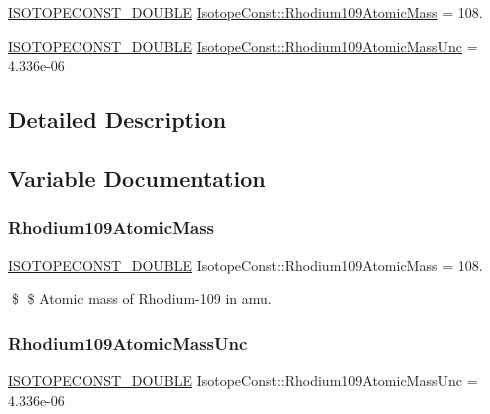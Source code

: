 \begin{DoxyCompactItemize}
\item 
\mbox{\hyperlink{group___isotope_const-_macros_ga8f45a7272ce02c0b4c65c44636ed719a}{I\+S\+O\+T\+O\+P\+E\+C\+O\+N\+S\+T\+\_\+\+D\+O\+U\+B\+LE}} \mbox{\hyperlink{group___isotope_const-_rhodium-_rh109_ga35e45ef6b10371bcb2f4fcdcb2b3c561}{Isotope\+Const\+::\+Rhodium109\+Atomic\+Mass}} = 108.
\item 
\mbox{\hyperlink{group___isotope_const-_macros_ga8f45a7272ce02c0b4c65c44636ed719a}{I\+S\+O\+T\+O\+P\+E\+C\+O\+N\+S\+T\+\_\+\+D\+O\+U\+B\+LE}} \mbox{\hyperlink{group___isotope_const-_rhodium-_rh109_ga21c3affbc5914f3138fb41a68f8fac2c}{Isotope\+Const\+::\+Rhodium109\+Atomic\+Mass\+Unc}} = 4.\+336e-\/06
\end{DoxyCompactItemize}


\subsection{Detailed Description}


\subsection{Variable Documentation}
\mbox{\label{group___isotope_const-_rhodium-_rh109_ga35e45ef6b10371bcb2f4fcdcb2b3c561}} 
\subsubsection{\texorpdfstring{Rhodium109\+Atomic\+Mass}{Rhodium109AtomicMass}}
{\footnotesize\ttfamily \mbox{\hyperlink{group___isotope_const-_macros_ga8f45a7272ce02c0b4c65c44636ed719a}{I\+S\+O\+T\+O\+P\+E\+C\+O\+N\+S\+T\+\_\+\+D\+O\+U\+B\+LE}} Isotope\+Const\+::\+Rhodium109\+Atomic\+Mass = 108.}

\$ \$ Atomic mass of Rhodium-\/109 in amu. \mbox{\label{group___isotope_const-_rhodium-_rh109_ga21c3affbc5914f3138fb41a68f8fac2c}} 
\subsubsection{\texorpdfstring{Rhodium109\+Atomic\+Mass\+Unc}{Rhodium109AtomicMassUnc}}
{\footnotesize\ttfamily \mbox{\hyperlink{group___isotope_const-_macros_ga8f45a7272ce02c0b4c65c44636ed719a}{I\+S\+O\+T\+O\+P\+E\+C\+O\+N\+S\+T\+\_\+\+D\+O\+U\+B\+LE}} Isotope\+Const\+::\+Rhodium109\+Atomic\+Mass\+Unc = 4.\+336e-\/06}

